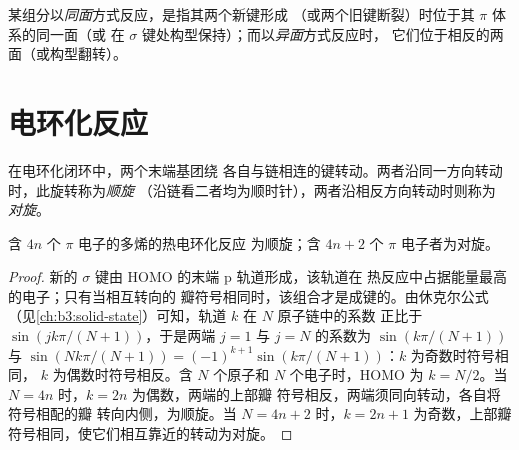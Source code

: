 \begin{definition}[同面与异面]\label{def:b3:pericyclic:faciality}
某组分以\emph{同面}方式反应，是指其两个新键形成
（或两个旧键断裂）时位于其 $\pi$ 体系的同一面（或
在 $\sigma$ 键处构型保持）；而以\emph{异面}方式反应时，
它们位于相反的两面（或构型翻转）。
\end{definition}

\section{电环化反应}

\begin{definition}[顺旋与对旋]\label{def:b3:pericyclic:rotation-modes}
在电环化闭环中，两个末端基团绕
各自与链相连的键转动。两者沿同一方向转动时，此旋转称为\emph{顺旋}
（沿链看二者均为顺时针），两者沿相反方向转动时则称为
\emph{对旋}。
\end{definition}

\begin{theorem}[电环化反应]\label{thm:b3:pericyclic:electrocyclic}
含 $4n$ 个 $\pi$ 电子的多烯的热电环化反应
为顺旋；含 $4n + 2$ 个 $\pi$ 电子者为对旋。
\end{theorem}

\begin{proof}
新的 $\sigma$ 键由 HOMO 的末端 p 轨道形成，该轨道在
热反应中占据能量最高的电子；只有当相互转向的
瓣符号相同时，该组合才是成键的。由休克尔公式
（见\cref{ch:b3:solid-state}）可知，轨道 $k$ 在 $N$ 原子链中的系数
正比于 $\sin(jk\pi/(N + 1))$，于是两端 $j = 1$ 与 $j = N$ 的系数为
$\sin(k\pi/(N + 1))$ 与 $\sin(Nk\pi/(N + 1)) = (-1)^{k+1}\sin(k\pi/(N + 1))$：$k$ 为奇数时符号相同，
$k$ 为偶数时符号相反。含 $N$ 个原子和 $N$ 个电子时，HOMO 为
$k = N/2$。当 $N = 4n$ 时，$k = 2n$ 为偶数，两端的上部瓣
符号相反，两端须同向转动，各自将符号相配的瓣
转向内侧，为顺旋。当 $N = 4n + 2$ 时，$k = 2n + 1$ 为奇数，上部瓣
符号相同，使它们相互靠近的转动为对旋。
\end{proof}

